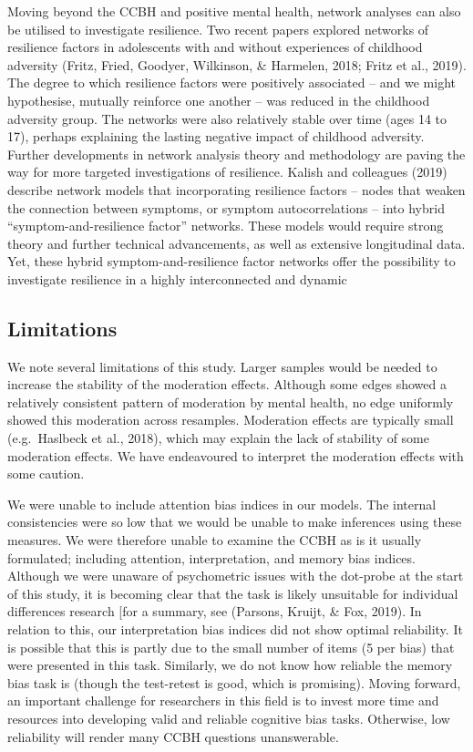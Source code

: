 \documentclass[man,floatsintext]{apa6}
\begin{document}
Moving beyond the CCBH and positive mental health, network analyses can also be utilised to investigate resilience. Two recent papers explored networks of resilience factors in adolescents with and without experiences of childhood adversity (Fritz, Fried, Goodyer, Wilkinson, \& Harmelen, 2018; Fritz et al., 2019). The degree to which resilience factors were positively associated -- and we might hypothesise, mutually reinforce one another -- was reduced in the childhood adversity group. The networks were also relatively stable over time (ages 14 to 17), perhaps explaining the lasting negative impact of childhood adversity. Further developments in network analysis theory and methodology are paving the way for more targeted investigations of resilience. Kalish and colleagues (2019) describe network models that incorporating resilience factors -- nodes that weaken the connection between symptoms, or symptom autocorrelations -- into hybrid \enquote{symptom-and-resilience factor} networks. These models would require strong theory and further technical advancements, as well as extensive longitudinal data. Yet, these hybrid symptom-and-resilience factor networks offer the possibility to investigate resilience in a highly interconnected and dynamic

\hypertarget{limitations}{%
\subsection{Limitations}\label{limitations}}

We note several limitations of this study. Larger samples would be needed to increase the stability of the moderation effects. Although some edges showed a relatively consistent pattern of moderation by mental health, no edge uniformly showed this moderation across resamples. Moderation effects are typically small (e.g.~Haslbeck et al., 2018), which may explain the lack of stability of some moderation effects. We have endeavoured to interpret the moderation effects with some caution.

We were unable to include attention bias indices in our models. The internal consistencies were so low that we would be unable to make inferences using these measures. We were therefore unable to examine the CCBH as is it usually formulated; including attention, interpretation, and memory bias indices. Although we were unaware of psychometric issues with the dot-probe at the start of this study, it is becoming clear that the task is likely unsuitable for individual differences research {[}for a summary, see (Parsons, Kruijt, \& Fox, 2019). In relation to this, our interpretation bias indices did not show optimal reliability. It is possible that this is partly due to the small number of items (5 per bias) that were presented in this task. Similarly, we do not know how reliable the memory bias task is (though the test-retest is good, which is promising). Moving forward, an important challenge for researchers in this field is to invest more time and resources into developing valid and reliable cognitive bias tasks. Otherwise, low reliability will render many CCBH questions unanswerable.
\end{document}
